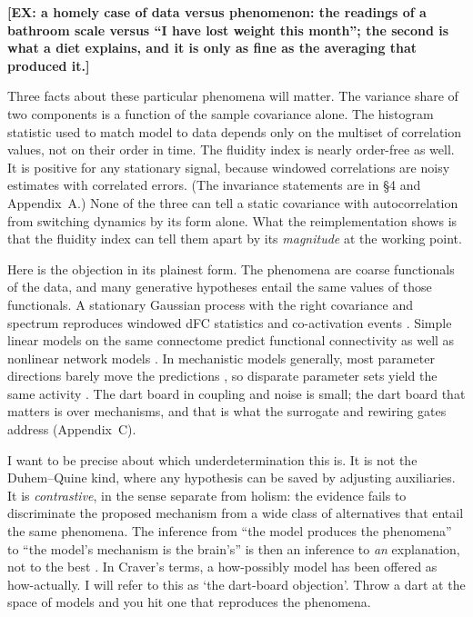 \documentclass[11pt]{article}
\theoremstyle{definition}\newtheorem{observation}{Observation}
\theoremstyle{remark}\newtheorem{remark}{Remark}
\newcommand{\EX}[1]{\textcolor{orange!80!black}{\textbf{[EX: #1]}}}
\begin{document}
\EX{a homely case of data versus phenomenon: the readings of a bathroom scale versus ``I have lost weight this month''; the second is what a diet explains, and it is only as fine as the averaging that produced it.}

Three facts about these particular phenomena will matter. The variance share of two components is a function of the sample covariance alone. The histogram statistic used to match model to data depends only on the multiset of correlation values, not on their order in time. The fluidity index is nearly order-free as well. It is positive for any stationary signal, because windowed correlations are noisy estimates with correlated errors. (The invariance statements are in \S4 and Appendix~A.) None of the three can tell a static covariance with autocorrelation from switching dynamics by its form alone. What the reimplementation shows is that the fluidity index can tell them apart by its \emph{magnitude} at the working point.

Here is the objection in its plainest form. The phenomena are coarse functionals of the data, and many generative hypotheses entail the same values of those functionals. A stationary Gaussian process with the right covariance and spectrum reproduces windowed dFC statistics \parencite{hindriks2016,liegeois2017,laumann2017} and co-activation events \parencite{novelli2022}. Simple linear models on the same connectome predict functional connectivity as well as nonlinear network models \parencite{messe2014,messe2015}. In mechanistic models generally, most parameter directions barely move the predictions \parencite{gutenkunst2007,machta2013,transtrum2015}, so disparate parameter sets yield the same activity \parencite{prinz2004}. The dart board in coupling and noise is small; the dart board that matters is over mechanisms, and that is what the surrogate and rewiring gates address (Appendix~C).

I want to be precise about which underdetermination this is. It is not the Duhem--Quine kind, where any hypothesis can be saved by adjusting auxiliaries. It is \emph{contrastive}, in the sense \textcite{laudan1991} separate from holism: the evidence fails to discriminate the proposed mechanism from a wide class of alternatives that entail the same phenomena. The inference from ``the model produces the phenomena'' to ``the model's mechanism is the brain's'' is then an inference to \emph{an} explanation, not to the best \parencite{lipton2004}. In Craver's terms, a how-possibly model has been offered as how-actually. I will refer to this as `the dart-board objection'. Throw a dart at the space of models and you hit one that reproduces the phenomena.
\end{document}
